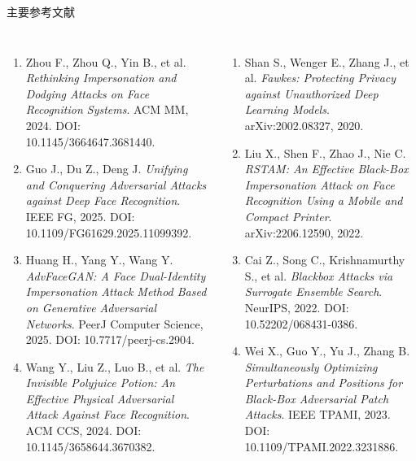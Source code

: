 \begin{frame}{主要参考文献}
  \tiny
  \begin{columns}[T,onlytextwidth]
    \begin{enumerate}\setlength{\itemsep}{3pt}
      \item Zhou F., Zhou Q., Yin B., et al.
        \emph{Rethinking Impersonation and Dodging Attacks on Face Recognition Systems}.
        ACM MM, 2024. DOI: 10.1145/3664647.3681440.

      \item Guo J., Du Z., Deng J.
        \emph{Unifying and Conquering Adversarial Attacks against Deep Face Recognition}.
        IEEE FG, 2025. DOI: 10.1109/FG61629.2025.11099392.

      \item Huang H., Yang Y., Wang Y.
        \emph{AdvFaceGAN: A Face Dual-Identity Impersonation Attack Method Based on Generative Adversarial Networks}.
        PeerJ Computer Science, 2025. DOI: 10.7717/peerj-cs.2904.

      \item Wang Y., Liu Z., Luo B., et al.
        \emph{The Invisible Polyjuice Potion: An Effective Physical Adversarial Attack Against Face Recognition}.
        ACM CCS, 2024. DOI: 10.1145/3658644.3670382.
    \end{enumerate}

    \begin{enumerate}\setlength{\itemsep}{3pt}
      \setcounter{enumi}{4}
      \item Shan S., Wenger E., Zhang J., et al.
        \emph{Fawkes: Protecting Privacy against Unauthorized Deep Learning Models}.
        arXiv:2002.08327, 2020.

      \item Liu X., Shen F., Zhao J., Nie C.
        \emph{RSTAM: An Effective Black-Box Impersonation Attack on Face Recognition Using a Mobile and Compact Printer}.
        arXiv:2206.12590, 2022.

      \item Cai Z., Song C., Krishnamurthy S., et al.
        \emph{Blackbox Attacks via Surrogate Ensemble Search}.
        NeurIPS, 2022. DOI: 10.52202/068431-0386.

      \item Wei X., Guo Y., Yu J., Zhang B.
        \emph{Simultaneously Optimizing Perturbations and Positions for Black-Box Adversarial Patch Attacks}.
        IEEE TPAMI, 2023. DOI: 10.1109/TPAMI.2022.3231886.
    \end{enumerate}
  \end{columns}
\end{frame}
